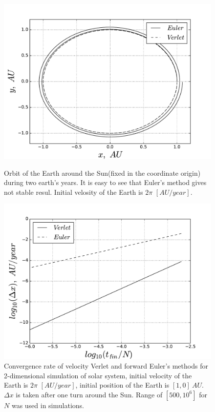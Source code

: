 \documentclass[10pt]{article}
\begin{document}
\clearpage

\newpage
\begin{figure}[ht]
  \begin{center}
    \includegraphics[scale=0.5]{eu_vs_vl}
    \caption {Orbit of the Earth around the Sun(fixed in the coordinate origin) during two earth's years. It is easy to see that Euler's method gives not stable resul. Initial velosity of the Earth is $2\pi$ $[AU/year]$. }
    \label{fig:verlet_vs_euler}
  \end{center}

\vspace*{\floatsep}

  \begin{center}
    \includegraphics[scale=0.5]{c_rate}
    \caption {Convergence rate of velocity Verlet and forward Euler's methods for 2-dimensional simulation of solar system, initial velocity of the Earth is $2\pi$ $[AU/year]$, initial position of the Earth is $[1,0]\ AU$. $\Delta x$ is taken after one turn around the Sun. Range of $[500, 10^6]$ for $N$ was used in simulations. }
    \label{fig:slope}
  \end{center}
\end{figure}
\clearpage
\end{document}
